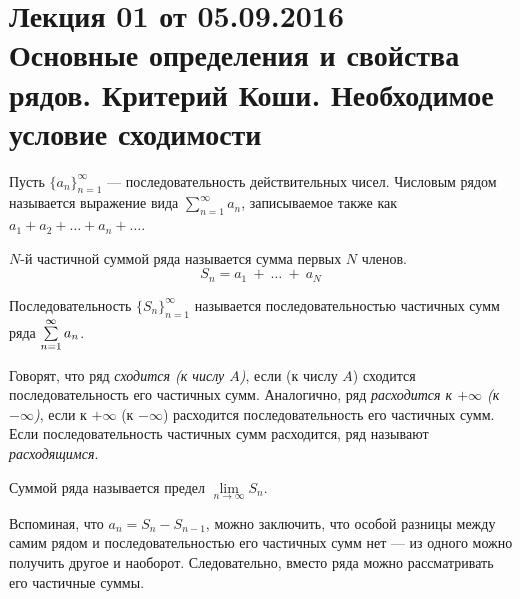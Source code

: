\documentclass[a4paper, 12pt]{article}
\begin{document}
\pagestyle{fancy}
\section{Лекция 01 от 05.09.2016 \\ Основные определения и свойства рядов. Критерий Коши. Необходимое условие сходимости}
\begin{Def}
	Пусть \(\{a_n\}^{\infty}_{n=1}\) --- последовательность действительных чисел. Числовым рядом называется выражение вида \(\sum\limits_{n=1}^{\infty}a_n\), записываемое также как \(a_1 + a_2 + \ldots + a_n + \ldots \).
	
\end{Def}
\begin{Def}
	\(N\)-й частичной суммой ряда называется сумма первых \(N\) членов. 
	$$S_n = a_1~+~\ldots~+~a_N$$
\end{Def}

\begin{Def}
	Последовательность \(\{S_n\}^{\infty}_{n=1}\)
	называется последовательностью частичных сумм ряда $\sum\limits_{n=1}^{\infty}a_n$.
\end{Def}

Говорят, что ряд \textit{сходится (к числу $A$)}, если (к числу $A$) сходится последовательность его частичных сумм. Аналогично, ряд \textit{расходится к $+\infty$ (к $-\infty$)}, если к $+\infty$ (к $-\infty$) расходится последовательность его частичных сумм. Если последовательность частичных сумм расходится, ряд называют \textit{расходящимся}.

\begin{Def}
Суммой ряда называется предел $\lim\limits_{n \to \infty} S_n$.
\end{Def}
Вспоминая, что $a_n = S_{n} - S_{n-1}$, можно заключить, что особой разницы между самим рядом и последовательностью его частичных сумм нет --- из одного можно получить другое и наоборот. Следовательно, вместо ряда можно рассматривать его частичные суммы.
\end{document}
